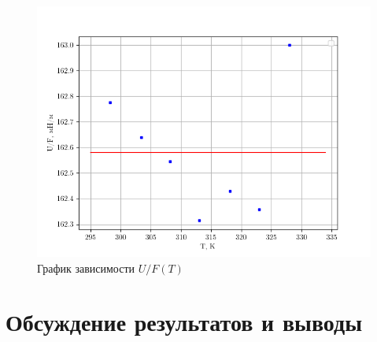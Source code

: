 \documentclass[12pt,a4paper]{article}
\begin{document}
\begin{enumerate}
     
        \begin{figure}[h!]
    \centering
    \includegraphics[scale=0.75]{UF(T).png}
    \caption {График зависимости $U/F (T)$}
\end{figure}
\end{enumerate}



\section{Обсуждение результатов и выводы}
\end{document}
